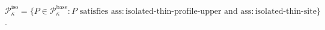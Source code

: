 \(\mathcal P_{\kappa}^{\mathrm{iso}}=\{P\in\mathcal P_{\kappa}^{\mathrm{base}}:P\text{ satisfies }\mathrm{ass:isolated\text{-}thin\text{-}profile\text{-}upper}\text{ and }\mathrm{ass:isolated\text{-}thin\text{-}site}\}\).